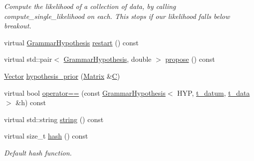 \begin{DoxyCompactItemize}
\begin{DoxyCompactList}\small\item\em Compute the likelihood of a collection of data, by calling compute\+\_\+single\+\_\+likelihood on each. This stops if our likelihood falls below breakout. \end{DoxyCompactList}\item 
virtual \hyperlink{class_grammar_hypothesis}{Grammar\+Hypothesis} \hyperlink{class_grammar_hypothesis_a8d0042f4858879ce2585df382ce78b0a}{restart} () const
\item 
virtual std\+::pair$<$ \hyperlink{class_grammar_hypothesis}{Grammar\+Hypothesis}, double $>$ \hyperlink{class_grammar_hypothesis_a5b642e0ccd5c1cebdbd3f7dfdc81cfcf}{propose} () const
\item 
\hyperlink{_eigen_numerics_8h_aca2956bc379bce2ed88ab3c0e1b61d1d}{Vector} \hyperlink{class_grammar_hypothesis_a9fb937f94fbe121dcba164f378e99080}{hypothesis\+\_\+prior} (\hyperlink{_eigen_numerics_8h_a645222978e81acfb2523a9bce34aecc0}{Matrix} \&\hyperlink{class_grammar_hypothesis_a2147efc4d1268e115803bd34f63f1c35}{C})
\item 
virtual bool \hyperlink{class_grammar_hypothesis_a8a64510ebb2af15474bdae7169049c94}{operator==} (const \hyperlink{class_grammar_hypothesis}{Grammar\+Hypothesis}$<$ H\+YP, \hyperlink{class_bayesable_a7c93a2eeab708378eb321745908718d4}{t\+\_\+datum}, \hyperlink{class_bayesable_a70a593a67c7d43239ecc06bb4fd06a6b}{t\+\_\+data} $>$ \&h) const
\item 
virtual std\+::string \hyperlink{class_grammar_hypothesis_a75267d7b68cd9b3634f84a464877c07c}{string} () const
\item 
virtual size\+\_\+t \hyperlink{class_grammar_hypothesis_a5b269a5ed433b94f6b2796f30a15fd9e}{hash} () const
\begin{DoxyCompactList}\small\item\em Default hash function. \end{DoxyCompactList}\end{DoxyCompactItemize}
